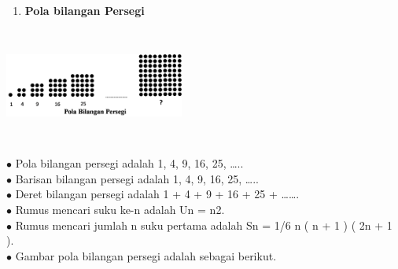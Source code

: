 \documentclass[11pt,fleqn]{book} %
\begin{document}
\noindent
\begin{enumerate}
	\item  \textbf{ Pola bilangan Persegi}
\end{enumerate}
\noindent
\begin{center}
	\noindent \includegraphics*[width=2.32in, height=1.48in, keepaspectratio=false, trim=0.00in 0.11in 0.00in 0.00in]{Pictures/24.PNG}
\end{center}
\noindent
\noindent$\bullet$  Pola bilangan persegi adalah 1, 4, 9, 16, 25, …..\\
\noindent $\bullet$ Barisan bilangan persegi adalah 1, 4, 9, 16, 25, …..\\
\noindent$\bullet$ Deret bilangan persegi adalah 1 + 4 + 9 + 16 + 25 + …….\\
\noindent$\bullet$ Rumus mencari suku ke-n adalah Un = n2.\\
\noindent $\bullet$ Rumus mencari jumlah n suku pertama adalah Sn = 1/6 n ( n + 1 ) ( 2n + 1 ).\\
\noindent $\bullet$ Gambar pola bilangan persegi adalah sebagai berikut.\\
\end{document}
